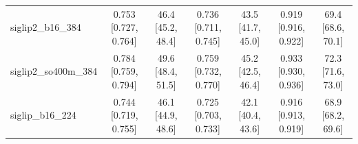 \begin{table}[t]
\begin{tabular}{lcccccc}
siglip2\_b16\_384 & 0.753 [0.727, 0.764] & 46.4 [45.2, 48.4] & 0.736 [0.711, 0.745] & 43.5 [41.7, 45.0] & 0.919 [0.916, 0.922] & 69.4 [68.6, 70.1] \\
siglip2\_so400m\_384 & 0.784 [0.759, 0.794] & 49.6 [48.4, 51.5] & 0.759 [0.732, 0.770] & 45.2 [42.5, 46.4] & 0.933 [0.930, 0.936] & 72.3 [71.6, 73.0] \\
siglip\_b16\_224 & 0.744 [0.719, 0.755] & 46.1 [44.9, 48.6] & 0.725 [0.703, 0.733] & 42.1 [40.4, 43.6] & 0.916 [0.913, 0.919] & 68.9 [68.2, 69.6] \\
\bottomrule\end{tabular}
\end{table}
